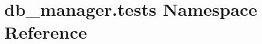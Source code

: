 \hypertarget{namespacedb__manager_1_1tests}{\section{db\-\_\-manager.\-tests Namespace Reference}
\label{namespacedb__manager_1_1tests}
}
